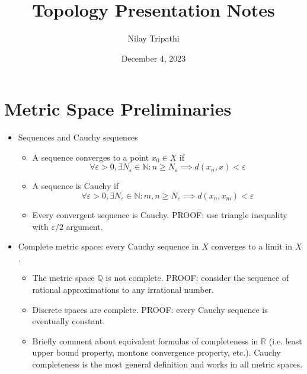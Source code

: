 \documentclass{article}
\title{Topology Presentation Notes}
\author{Nilay Tripathi }
\date{December 4, 2023}
\newcommand{\R}{\mathbb{R}}
\newcommand{\Q}{\mathbb{Q}}
\newcommand{\N}{\mathbb{N}}
\theoremstyle{plain}
\theoremstyle{definition}
\begin{document}
    \maketitle
    \tableofcontents
		
		\section{Metric Space Preliminaries}
		\begin{itemize}
				\item Sequences and Cauchy sequences 
						\begin{itemize}
								\item A sequence converges to a point $x_0\in X$ if 
										\begin{equation*}
												\forall \varepsilon > 0, \exists N_{\varepsilon} \in \N : n\geq N_{\varepsilon} \implies d(x_n, x) < \varepsilon
										\end{equation*}

								\item A sequence is Cauchy if 
										\begin{equation*}
												\forall \varepsilon > 0, \exists N_{\varepsilon} \in \N : m,n \geq N_{\varepsilon} \implies d(x_n, x_m) < \varepsilon
										\end{equation*}

								\item Every convergent sequence is Cauchy. PROOF: use triangle inequality with $\varepsilon / 2$ argument. 
						\end{itemize}

				\item Complete metric space: every Cauchy sequence in $X$ converges to a limit in $X$. 
						\begin{itemize}
								\item The metric space $\Q$ is not complete. PROOF: consider the sequence of rational approximations to any irrational number. 
								\item Discrete spaces are complete. PROOF: every Cauchy sequence is eventually constant. 
								\item Briefly comment about equivalent formulas of completeness in $\R$ (i.e. least upper bound property, montone convergence property, etc.). Cauchy completeness is the most general definition and works in all metric spaces.
						\end{itemize}
		\end{itemize}
\end{document}
